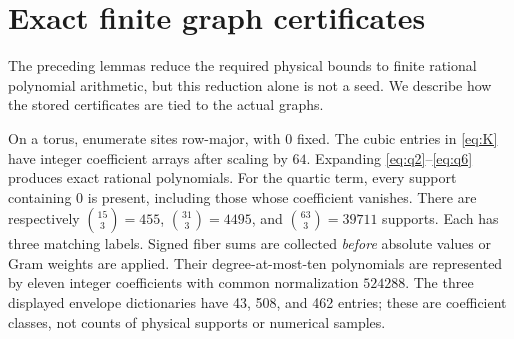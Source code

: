 \section{Exact finite graph certificates}\label{sec:certificates}
The preceding lemmas reduce the required physical bounds to finite rational
polynomial arithmetic, but this reduction alone is not a seed. We describe
how the stored certificates are tied to the actual graphs.

On a torus, enumerate sites row-major, with $0$ fixed. The cubic entries in
\eqref{eq:K} have integer coefficient arrays after scaling by $64$.
Expanding \eqref{eq:q2}--\eqref{eq:q6} produces exact rational polynomials.
For the quartic term, every support containing $0$ is present, including those
whose coefficient vanishes. There are respectively
$\binom{15}{3}=455$, $\binom{31}{3}=4495$, and $\binom{63}{3}=39711$ supports.
Each has three matching labels. Signed fiber sums are collected \emph{before}
absolute values or Gram weights are applied. Their degree-at-most-ten
polynomials are represented by eleven integer coefficients with common
normalization $524288$. The three displayed envelope dictionaries have
43, 508, and 462 entries; these are coefficient classes, not counts of physical
supports or numerical samples.

